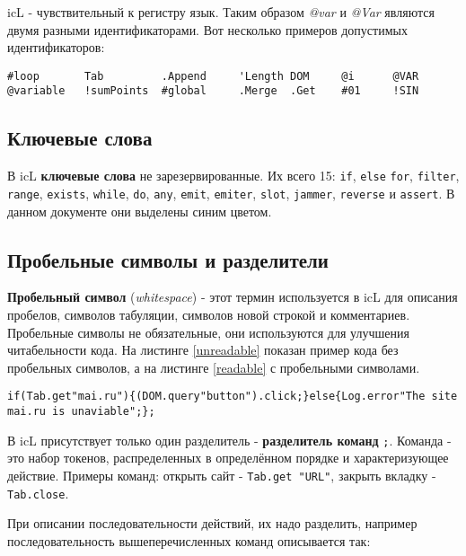 icL - чувствительный к регистру язык. Таким образом \textit{@var} и \textit{@Var} являются двумя разными идентификаторами. Вот несколько примеров допустимых идентификаторов:

\begin{lstlisting}[numbers=none]
#loop		Tab		    .Append		'Length	DOM	    @i	 	@VAR
@variable	!sumPoints	#global		.Merge	.Get	#01		!SIN
\end{lstlisting}

\subsection{Ключевые слова}

В icL \textbf{ключевые слова} не зарезервированные. Их всего 15: \lstinline`if`, \lstinline|else| \lstinline`for`, \lstinline`filter`, \lstinline`range`, \lstinline`exists`, \lstinline`while`, \lstinline`do`, \lstinline`any`, \lstinline`emit`, \lstinline`emiter`, \lstinline`slot`, \lstinline|jammer|, \lstinline|reverse| и \lstinline|assert|. В данном документе они выделены синим цветом.

\subsection{Пробельные символы и разделители}

\textbf{Пробельный символ} (\textit{whitespace}) - этот термин используется в icL для описания пробелов, символов табуляции, символов новой строкой и комментариев. Пробельные символы не обязательные, они используются для улучшения читабельности кода. На листинге \ref{unreadable} показан пример кода без пробельных символов, а на листинге \ref{readable} с пробельными символами.

\begin{lstlisting}[caption=Koд без пробельных символов,label=unreadable]
if(Tab.get"mai.ru"){(DOM.query"button").click;}else{Log.error"The site mai.ru is unaviable";};
\end{lstlisting}

В icL присутствует только один разделитель - \textbf{разделитель команд} \lstinline`;`. Команда - это набор токенов, распределенных в определённом порядке и характеризующее действие. Примеры команд: открыть сайт - \lstinline`Tab.get "URL"`, закрыть вкладку - \lstinline`Tab.close`.

При описании последовательности действий, их надо разделить, например последовательность вышеперечисленных команд описывается так:

